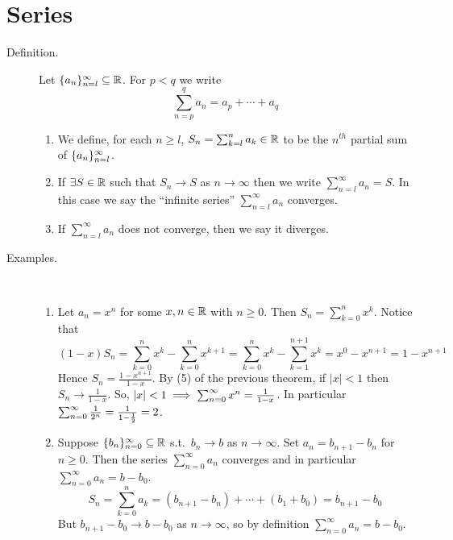\documentclass[letterpaper,11pt]{article}
\begin{document}
\section{Series}

\begin{description}
\item[Definition.] Let $\{a_n\}_{n=l}^\infty\subseteq\mathbb{R}$. For $p<q$ we write
    \[
    \sum_{n=p}^qa_n=a_p+\cdots+a_q
    \]
    \begin{enumerate}[1)]
    \item We define, for each $n\ge l$, $S_n=\sum_{k=l}^na_k\in\mathbb{R}$
        to be the $n^{th}$ partial sum of $\{a_n\}_{n=l}^\infty$.
    \item If $\exists S\in\mathbb{R}$ such that $S_n\to S$ as $n\to\infty$ then
        we write $\sum_{n=l}^\infty a_n=S$. In this case we say the
        ``infinite series'' $\sum_{n=l}^\infty a_n$ converges.
    \item If $\sum_{n=l}^\infty a_n$ does not converge, then
        we say it diverges.
    \end{enumerate}

\item[Examples.]\text{}\vspace{-0.2in}\\
  \begin{enumerate}[1)]
  \item Let $a_n=x^n$ for some $x,n\in\mathbb{R}$ with $n\ge0$.
      Then $S_n=\sum_{k=0}^nx^k$. Notice that
      \[
      (1-x)S_n=\sum_{k=0}^n x^k-\sum_{k=0}^nx^{k+1}=
      \sum_{k=0}^nx^k-\sum_{k=1}^{n+1}x^k=x^0-x^{n+1}=1-x^{n+1}
      \]
      Hence $S_n=\frac{1-x^{n+1}}{1-x}$. By (5) of the previous theorem,
      if $|x|<1$ then $S_n\to\frac{1}{1-x}$.
        So, $|x|<1\implies\sum_{n=0}^\infty x^n=\frac{1}{1-x}$. 
        In particular $\sum_{n=0}^\infty \frac{1}{2^n}=\frac{1}{1-\frac{1}{2}}=2$.


  \item Suppose $\{b_n\}_{n=0}^\infty\subseteq\mathbb{R}$ s.t.\ $b_n\to b$ as $n\to\infty$.
      Set $a_n=b_{n+1}-b_n$ for $n\ge 0$. Then the series $\sum_{n=0}^\infty a_n$
      converges and in particular $\sum_{n=0}^\infty a_n=b-b_0$.
      \[
      S_n=\sum_{k=0}^n a_k=(b_{n+1}-b_n)+\cdots+(b_1+b_0)=b_{n+1}-b_0
      \]
      But $b_{n+1}-b_0\to b-b_0$ as $n\to\infty$, so by definition
      $\sum_{n=0}^\infty a_n=b-b_0$.
  \end{enumerate}
\end{description}
\end{document}
